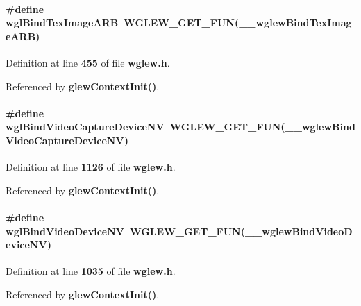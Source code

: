 \paragraph[{wgl\+Bind\+Tex\+Image\+A\+RB}]{\setlength{\rightskip}{0pt plus 5cm}\#define wgl\+Bind\+Tex\+Image\+A\+RB~{\bf W\+G\+L\+E\+W\+\_\+\+G\+E\+T\+\_\+\+F\+UN}({\bf \+\_\+\+\_\+wglew\+Bind\+Tex\+Image\+A\+RB})}\label{wglew_8h_aeed8540d0ee878aeb84eea16b00e71f6}


Definition at line {\bf 455} of file {\bf wglew.\+h}.



Referenced by {\bf glew\+Context\+Init()}.

\paragraph[{wgl\+Bind\+Video\+Capture\+Device\+NV}]{\setlength{\rightskip}{0pt plus 5cm}\#define wgl\+Bind\+Video\+Capture\+Device\+NV~{\bf W\+G\+L\+E\+W\+\_\+\+G\+E\+T\+\_\+\+F\+UN}({\bf \+\_\+\+\_\+wglew\+Bind\+Video\+Capture\+Device\+NV})}\label{wglew_8h_a171d4d1ec74892dcfae7b7fb3b9d3b72}


Definition at line {\bf 1126} of file {\bf wglew.\+h}.



Referenced by {\bf glew\+Context\+Init()}.

\paragraph[{wgl\+Bind\+Video\+Device\+NV}]{\setlength{\rightskip}{0pt plus 5cm}\#define wgl\+Bind\+Video\+Device\+NV~{\bf W\+G\+L\+E\+W\+\_\+\+G\+E\+T\+\_\+\+F\+UN}({\bf \+\_\+\+\_\+wglew\+Bind\+Video\+Device\+NV})}\label{wglew_8h_a6bc0f437b189c4e3f5b4bfcd3539c6cc}


Definition at line {\bf 1035} of file {\bf wglew.\+h}.



Referenced by {\bf glew\+Context\+Init()}.

